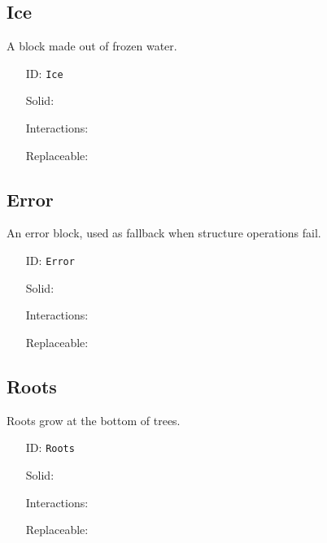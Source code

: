 \subsection{Ice}\label{subsec:blocks_ice}
A block made out of frozen water.
\newline
\begin{itemize}[nosep]
    \item[ID:] \texttt{Ice}
    \item[Solid:]  \Checkmark \item[Interactions:]  \Checkmark \item[Replaceable:]  \XSolidBrush
\end{itemize}

\subsection{Error}\label{subsec:blocks_error}
An error block, used as fallback when structure operations fail.
\newline
\begin{itemize}[nosep]
    \item[ID:] \texttt{Error}
    \item[Solid:]  \Checkmark \item[Interactions:]  \XSolidBrush \item[Replaceable:]  \XSolidBrush
\end{itemize}

\subsection{Roots}\label{subsec:blocks_roots}
Roots grow at the bottom of trees.
\newline
\begin{itemize}[nosep]
    \item[ID:] \texttt{Roots}
    \item[Solid:]  \Checkmark \item[Interactions:]  \XSolidBrush \item[Replaceable:]  \XSolidBrush
\end{itemize}
